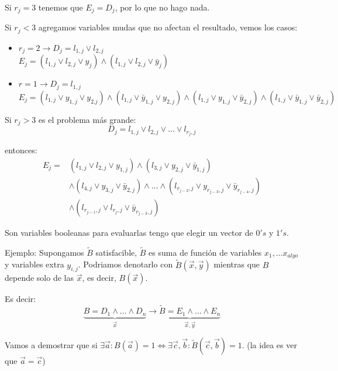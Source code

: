 \documentclass[12pt,a4paper]{article}
\begin{document}
Si $r_{j} = 3$ tenemos que $E_{j} = D_{j}$, por lo que no hago nada.
\medskip

Si $r_{j} < 3$ agregamos variables mudas que no afectan el resultado, vemos los casos:
\begin{itemize}
    \item $r_{j} = 2 \to D_{j}=l_{1,j}\vee l_{2,j}$\\
        $E_{j} = (l_{1,j} \vee l_{2,j} \vee y_{j}) \wedge (l_{1,j} \vee l_{2,j} \vee \bar{y}_{j})$
    \item $r=1 \to D_{j} = l_{1,j}$\\
        $E_{j} = (l_{1,j} \vee y_{1,j} \vee y_{2.j}) \wedge (l_{1,j} \vee \bar{y}_{1,j} \vee y_{2,j}) \wedge 
        (l_{1,j} \vee y_{1,j} \vee \bar{y}_{2,j}) \wedge (l_{1,j} \vee \bar{y}_{1,j} \vee \bar{y}_{2,j})$
\end{itemize}

Si $r_{j} > 3$ es el problema más grande:
$$D_{j} = l_{1,j} \vee l_{2,j} \vee \ldots \vee l_{r_{j},j}$$ 

entonces:
\begin{align*}
    E_{j} = &(l_{1,j} \vee l_{2,j} \vee y_{1,j}) \wedge (l_{3,j} \vee y_{2,j} \vee \bar{y}_{1,j}) \\
    &\wedge (l_{4,j} \vee y_{3,j} \vee \bar{y}_{2,j}) \wedge \ldots \wedge (l_{r_{j-2},j} \vee y_{r_{j-3},j} \vee \bar{y}_{r_{j-4},j})\\
    &\wedge (l_{r_{j-1},j} \vee l_{r_{j},j} \vee \bar{y}_{r_{j-3},j})
\end{align*}

Son variables booleanas para evaluarlas tengo que elegir un vector de $0's$ y $1's$.
\medskip

Ejemplo: Supongamos $\widetilde{B}$ satisfacible, $\widetilde{B}$ es suma de función de variables 
$x_{1},\ldots x_{algo}$ y variables extra $y_{i,j}$. Podriamos denotarlo con 
$\widetilde{B}(\overrightarrow{x}, \overrightarrow{y})$ mientras que $B$ depende 
solo de las $\overrightarrow{x}$, es decir, $B(\overrightarrow{x})$.
\medskip

Es decir:
$$\underbrace{B = D_{1} \wedge \ldots \wedge D_{n}}_{\overrightarrow{x}} \to \underbrace{\widetilde{B} = E_{1} \wedge \ldots \wedge E_{n}}_{\overrightarrow{x}, \overrightarrow{y}}$$

Vamos a demostrar que si  
$\exists \overrightarrow{a}: B(\overrightarrow{a}) = 1 \Leftrightarrow \exists \overrightarrow{c}, \overrightarrow{b} : \widetilde{B}(\overrightarrow{c}, \overrightarrow{b}) = 1$.
(la idea es ver que $\overrightarrow{a} = \overrightarrow{c}$)
\medskip
\end{document}
